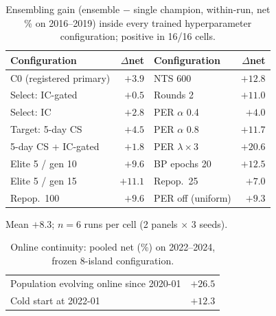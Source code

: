 \begin{table}[h]
\centering
\begin{threeparttable}
\caption{Ensembling gain (ensemble $-$ single champion, within-run, net \%
on 2016--2019) inside every trained hyperparameter configuration; positive
in 16/16 cells.}
\label{tab:invariance}
\begin{tabular}{lr@{\qquad}lr}
\toprule
Configuration & $\Delta$net & Configuration & $\Delta$net \\
\midrule
C0 (registered primary) & $+3.9$  & NTS 600            & $+12.8$ \\
Select: IC-gated        & $+0.5$  & Rounds 2           & $+11.0$ \\
Select: IC              & $+2.8$  & PER $\alpha$ 0.4   & $+4.0$  \\
Target: 5-day CS        & $+4.5$  & PER $\alpha$ 0.8   & $+11.7$ \\
5-day CS + IC-gated     & $+1.8$  & PER $\lambda{\times}3$ & $+20.6$ \\
Elite 5 / gen 10        & $+9.6$  & BP epochs 20       & $+12.5$ \\
Elite 5 / gen 15        & $+11.1$ & Repop.\ 25         & $+7.0$  \\
Repop.\ 100             & $+9.6$  & PER off (uniform)  & $+9.3$  \\
\bottomrule
\end{tabular}
\begin{tablenotes}\footnotesize
\item Mean $+8.3$; $n{=}6$ runs per cell (2 panels $\times$ 3 seeds).
\end{tablenotes}
\end{threeparttable}
\end{table}

\begin{table}[h]
\centering
\caption{Online continuity: pooled net (\%) on 2022--2024, frozen 8-island
configuration.}
\label{tab:continuity}
\begin{tabular}{lr}
\toprule
Population evolving online since 2020-01 & $+26.5$ \\
Cold start at 2022-01                     & $+12.3$ \\
\bottomrule
\end{tabular}
\end{table}

